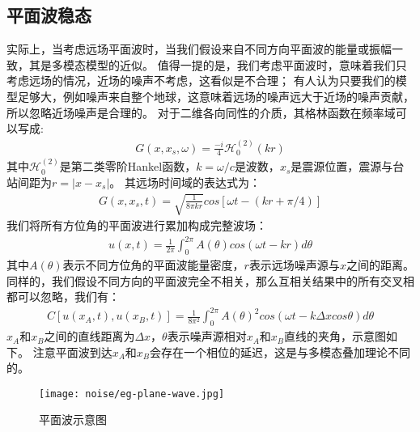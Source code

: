\subsection{平面波稳态}
实际上，当考虑远场平面波时，当我们假设来自不同方向平面波的能量或振幅一致，其是多模态模型的近似。
值得一提的是，我们考虑平面波时，意味着我们只考虑远场的情况，近场的噪声不考虑，这看似是不合理；
有人认为只要我们的模型足够大，例如噪声来自整个地球，这意味着远场的噪声远大于近场的噪声贡献，所以忽略近场噪声是合理的。
对于二维各向同性的介质，其格林函数在频率域可以写成:
\begin{align}
    G(x,x_s,\omega ) = \frac{-i}{4} \mathcal{H}_0^{(2)} (kr)
    \label{equ:gf-2d-f}
\end{align}
其中$\mathcal{H}_0^{(2)}$是第二类零阶Hankel函数，$k=\omega /c$是波数，$x_s$是震源位置，震源与台站间距为$r=|x-x_s|$。
其远场时间域的表达式为：
\begin{align}
    G(x,x_s,t ) = \sqrt{ \frac{1}{8 \pi kr} } cos[\omega t - (kr+\pi/4)]
    \label{equ:gf-2d-t}
\end{align}
我们将所有方位角的平面波进行累加构成完整波场：
\begin{align}
    u(x,t ) =  \frac{1}{2 \pi}  \int\nolimits_0^{2\pi} A(\theta) cos(\omega t - kr) d\theta
    \label{equ:gf-2d-sum}
\end{align}
其中$A(\theta)$表示不同方位角的平面波能量密度，$r$表示远场噪声源与$x$之间的距离。
同样的，我们假设不同方向的平面波完全不相关，那么互相关结果中的所有交叉相都可以忽略，我们有：
\begin{align}
    C[u(x_A,t),u(x_B,t)] =  \frac{1}{8\pi^2} \int\nolimits_{0}^{2\pi} A(\theta)^2 cos(\omega t - k\Delta x cos\theta) d\theta
    \label{equ:cc-pl}
\end{align}
$x_A$和$x_B$之间的直线距离为$\Delta x$，$\theta$表示噪声源相对$x_A$和$x_B$直线的夹角，示意图如下。
注意平面波到达$x_A$和$x_B$会存在一个相位的延迟，这是与多模态叠加理论不同的。

\begin{figure}[h]
    \centering
    \texttt{[image: noise/eg-plane-wave.jpg]}
    \caption{平面波示意图}
    \label{fig:eg-plane-wave}
\end{figure}

